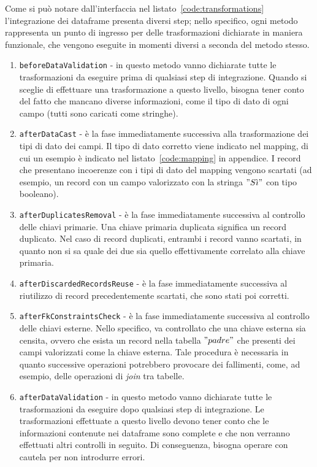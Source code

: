 \clearpage


Come si può notare dall'interfaccia nel listato~\ref{code:transformations} l'integrazione dei dataframe presenta diversi step;
nello specifico, ogni metodo rappresenta un punto di ingresso per delle trasformazioni dichiarate in maniera funzionale, che vengono eseguite in momenti diversi a seconda del metodo stesso.

\begin{enumerate}
    \item \texttt{beforeDataValidation} - in questo metodo vanno dichiarate tutte le trasformazioni da eseguire prima di qualsiasi step di integrazione.
    Quando si sceglie di effettuare una trasformazione a questo livello, bisogna tener conto del fatto che mancano diverse informazioni, come il tipo di dato di ogni campo (tutti sono caricati come stringhe).
    \item \texttt{afterDataCast} - è la fase immediatamente successiva alla trasformazione dei tipi di dato dei campi.
    Il tipo di dato corretto viene indicato nel mapping, di cui un esempio è indicato nel listato~\ref{code:mapping} in appendice.
    I record che presentano incoerenze con i tipi di dato del mapping vengono scartati (ad esempio, un record con un campo valorizzato con la stringa $"S\grave{\imath}"$ con tipo booleano).
    \item \texttt{afterDuplicatesRemoval} - è la fase immediatamente successiva al controllo delle chiavi primarie.
    Una chiave primaria duplicata significa un record duplicato.
    Nel caso di record duplicati, entrambi i record vanno scartati, in quanto non si sa quale dei due sia quello effettivamente correlato alla chiave primaria.
    \item \texttt{afterDiscardedRecordsReuse} - è la fase immediatamente successiva al riutilizzo di record precedentemente scartati, che sono stati poi corretti.
    \item \texttt{afterFkConstraintsCheck} - è la fase immediatamente successiva al controllo delle chiavi esterne.
    Nello specifico, va controllato che una chiave esterna sia censita, ovvero che esista un record nella tabella $"padre"$ che presenti dei campi valorizzati come la chiave esterna.
    Tale procedura è necessaria in quanto successive operazioni potrebbero provocare dei fallimenti, come, ad esempio, delle operazioni di \textit{join} tra tabelle.
    \item \texttt{afterDataValidation} - in questo metodo vanno dichiarate tutte le trasformazioni da eseguire dopo qualsiasi step di integrazione.
    Le trasformazioni effettuate a questo livello devono tener conto che le informazioni contenute nei dataframe sono complete e che non verranno effettuati altri controlli in seguito.
    Di conseguenza, bisogna operare con cautela per non introdurre errori.
\end{enumerate}
